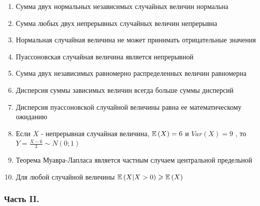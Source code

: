 \documentclass[12pt, a4paper]{article}\usepackage[]{graphicx}\usepackage[]{color}
\begin{document}
\begin{enumerate}
\item Сумма двух нормальных независимых случайных величин нормальна
\item Сумма любых двух непрерывных случайных величин непрерывна
\item Нормальная случайная величина не может принимать отрицательные значения
\item Пуассоновская случайная величина является непрерывной
\item Сумма двух независимых равномерно распределенных величин равномерна
\item Дисперсия суммы зависимых величин всегда больше суммы дисперсий
\item Дисперсия пуассоновской случайной величины равна ее математическому ожиданию
\item Если  $X$  - непрерывная случайная величина,  $\mathbb{E}\left(X\right)=6$  и  $Var\left(X\right)=9$ , то  $Y=\frac{X-6}{3} \sim N\left(0;1\right)$
\item Теорема Муавра-Лапласа является частным случаем центральной предельной
\item Для любой случайной величины  $\mathbb{E}\left(X|X>0\right)\geqslant \mathbb{E}\left(X\right)$
\end{enumerate}

\subsubsection*{Часть II.}
\end{document}
